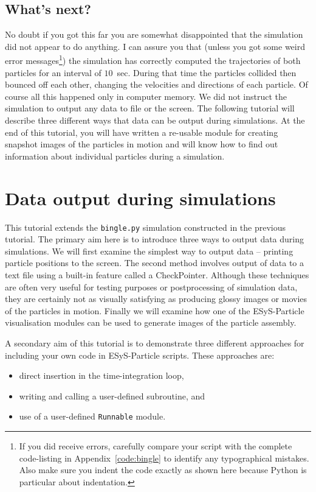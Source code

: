\subsection*{What's next?}

No doubt if you got this far you are somewhat disappointed that the simulation did not appear to do anything. I can assure you that (unless you got some weird error messages\footnote{If you did receive errors, carefully compare your script with the complete code-listing in Appendix~\ref{code:bingle} to identify any typographical mistakes. Also make sure you indent the code exactly as shown here because Python is particular about indentation.}) the simulation has correctly computed the trajectories of both particles for an interval of $10$~sec. During that time the particles collided then bounced off each other, changing the velocities and directions of each particle. Of course all this happened only in computer memory. We did not instruct the simulation to output any data to file or the screen.  The following tutorial will describe three different ways that data can be output during simulations. At the end of this tutorial, you will have written a re-usable module for creating snapshot images of the 
particles in motion and will know how to find out information about individual particles during a simulation.

\newpage
\section{Data output during simulations}

This tutorial extends the \texttt{bingle.py} simulation constructed in the previous tutorial. The primary aim here is to introduce three ways to output data during simulations. We will first examine the simplest way to output data -- printing particle positions to the screen. The second method involves output of data to a text file using a built-in feature called a CheckPointer. Although these techniques are often very useful for testing purposes or postprocessing of simulation data, they are certainly not as visually satisfying as producing glossy images or movies of the particles in motion. Finally we will examine how one of the ESyS-Particle visualisation modules can be used to generate images of the particle assembly. 

A secondary aim of this tutorial is to demonstrate three different approaches for including your own code in ESyS-Particle scripts. These approaches are:
\begin{itemize}
\item direct insertion in the time-integration loop,
\item writing and calling a user-defined subroutine, and 
\item use of a user-defined \texttt{Runnable} module.
\end{itemize}

